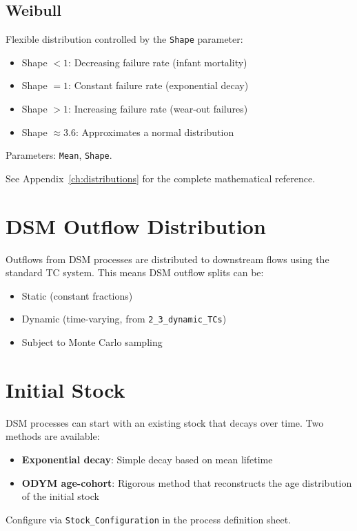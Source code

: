 \subsection{Weibull}
Flexible distribution controlled by the \texttt{Shape} parameter:
\begin{itemize}
  \item Shape $< 1$: Decreasing failure rate (infant mortality)
  \item Shape $= 1$: Constant failure rate (exponential decay)
  \item Shape $> 1$: Increasing failure rate (wear-out failures)
  \item Shape $\approx 3.6$: Approximates a normal distribution
\end{itemize}
Parameters: \texttt{Mean}, \texttt{Shape}.

See Appendix~\ref{ch:distributions} for the complete mathematical reference.

\section{DSM Outflow Distribution}

Outflows from DSM processes are distributed to downstream flows using the standard TC system. This means DSM outflow splits can be:
\begin{itemize}
  \item Static (constant fractions)
  \item Dynamic (time-varying, from \texttt{2\_3\_dynamic\_TCs})
  \item Subject to Monte Carlo sampling
\end{itemize}

\section{Initial Stock}

DSM processes can start with an existing stock that decays over time. Two methods are available:
\begin{itemize}
  \item \textbf{Exponential decay}: Simple decay based on mean lifetime
  \item \textbf{ODYM age-cohort}: Rigorous method that reconstructs the age distribution of the initial stock
\end{itemize}

Configure via \texttt{Stock\_Configuration} in the process definition sheet.
